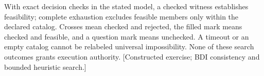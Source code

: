 \documentclass[11pt]{article}\usepackage[paperwidth=7in,paperheight=10in,textwidth=4.5in,textheight=8in,centering]{geometry}
\begin{document}
\begin{center}

\end{center}\medskip\noindent\footnotesize\raggedright With exact decision checks in the stated model, a checked witness establishes feasibility; complete exhaustion excludes feasible members only within the declared catalog. Crosses mean checked and rejected, the filled mark means checked and feasible, and a question mark means unchecked. A timeout or an empty catalog cannot be relabeled universal impossibility. None of these search outcomes grants execution authority. [Constructed exercise; BDI consistency and bounded heuristic search.]
\end{document}
